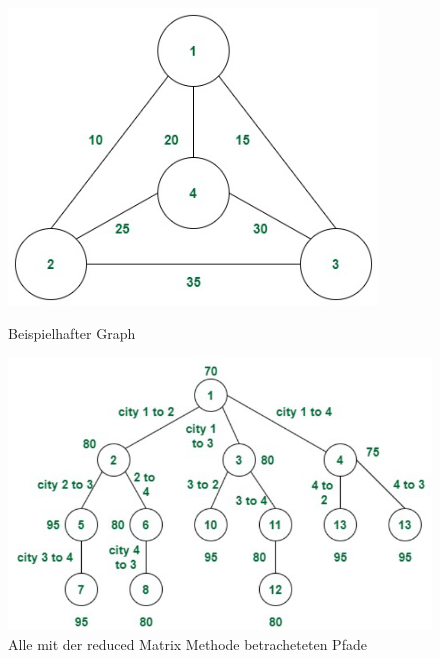 \begin{figure}[H]
\centering
\begin{minipage}{.4\textwidth}
  \centering

    \includegraphics[width=\textwidth]{images/reducedMatrixGraph.png}
    \caption{Beispielhafter Graph}
    \label{fig:reducedMatrixGraph}

\end{minipage}%
\begin{minipage}{.6\textwidth}
  \centering
    \includegraphics[width=\textwidth]{images/reducedMatrixTree.png}
    \caption{Alle mit der reduced Matrix Methode betracheteten Pfade}
    \label{fig:reducedMatrixTree}
\end{minipage}
\end{figure}


